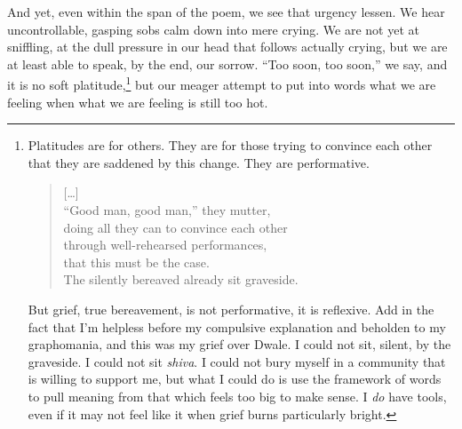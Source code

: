 \documentclass[12pt]{memoir}
\begin{document}
And yet, even within the span of the poem, we see that urgency lessen. We hear uncontrollable, gasping sobs calm down into mere crying. We are not yet at sniffling, at the dull pressure in our head that follows actually crying, but we are at least able to speak, by the end, our sorrow. ``Too soon, too soon,'' we say, and it is no soft platitude,\footnote{Platitudes are for others. They are for those trying to convince each other that they are saddened by this change. They are performative.
\begin{verse}
{[\ldots]} \\
``Good man, good man,'' they mutter, \\
doing all they can to convince each other \\
through well-rehearsed performances, \\
that this must be the case. \\
The silently bereaved already sit graveside.\par
\parencite{penguins}
\end{verse}\par
But grief, true bereavement, is not performative, it is reflexive. Add in the fact that I'm helpless before my compulsive explanation and beholden to my graphomania, and this was my grief over Dwale. I could not sit, silent, by the graveside. I could not sit \emph{shiva}. I could not bury myself in a community that is willing to support me, but what I could do is use the framework of words to pull meaning from that which feels too big to make sense. I \emph{do} have tools, even if it may not feel like it when grief burns particularly bright.} but our meager attempt to put into words what we are feeling when what we are feeling is still too hot.
\end{document}
